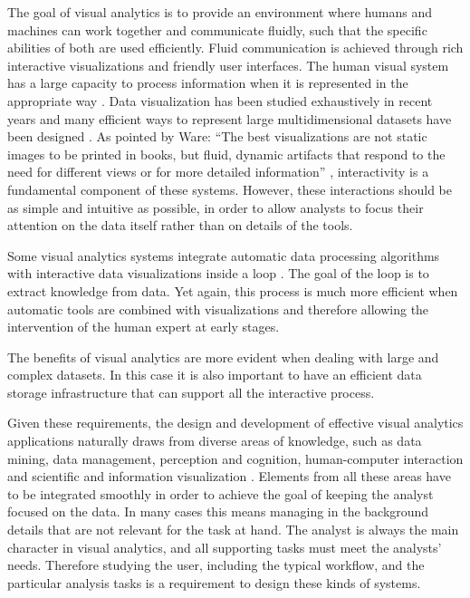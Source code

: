 The goal of visual analytics is to provide an environment where humans and machines can work
together and communicate fluidly, such that the specific abilities of both are used
efficiently. Fluid communication is achieved through rich interactive
visualizations and friendly user interfaces.
The human visual system has a large capacity to process information when it is
represented in the appropriate way \autocite{ware_information_2004}. Data visualization has been studied
exhaustively in recent years and many efficient ways to represent large multidimensional
datasets have been designed \autocite{heer_tour_2010}. As
pointed by Ware: "`The best visualizations are not static images to be printed in books, but fluid,
dynamic artifacts that respond to the need for different views or for more detailed
information"' \autocite{ware_information_2004}, interactivity is a fundamental component of these systems. 
However,  these interactions should be
as simple and intuitive as possible, in order to allow analysts to focus their attention on the
data itself \autocite{spence_information_2007} rather than on details of the tools. 

Some visual analytics systems integrate automatic data processing algorithms with interactive data visualizations
inside a loop \autocite{keim_mastering_2010}. The goal of the loop is to extract knowledge from data. Yet again, this process
is much more efficient when automatic tools are combined with visualizations and therefore allowing the intervention of the
human expert at early stages. 

The benefits of visual analytics are more evident when dealing with large and complex datasets. In this case it is also important
to have an efficient data storage infrastructure that can support all the interactive process. 

Given these requirements, the design and development of effective visual analytics
applications naturally draws from diverse areas of knowledge, such as data mining, data management, perception and cognition, human-computer interaction and scientific and information visualization \autocite{keim_visual_2008}. Elements from all these areas have to be integrated smoothly in order to achieve the goal of keeping the analyst focused on the data. In many cases this means managing in the background details that are not relevant for the task at hand. The analyst is always the main character in visual analytics, and all supporting tasks must meet the analysts' needs. Therefore studying the user, including the typical workflow, and the particular analysis tasks is a requirement to design these kinds of systems. 


